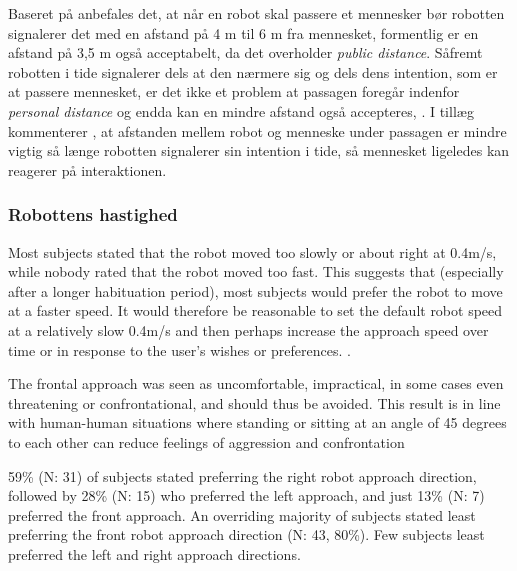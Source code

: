Baseret på \textcite[ss. 169-170]{PDF:HumanRobotEmodiedInteraction} anbefales det, at når en robot skal passere et mennesker bør robotten signalerer det med en afstand på 4 m til 6 m fra mennesket, formentlig er en afstand på 3,5 m også acceptabelt, da det overholder \textit{public distance}. Såfremt robotten i tide signalerer dels at den nærmere sig og dels dens intention, som er at passere mennesket, er det ikke et problem at passagen foregår indenfor \textit{personal distance} og endda kan en mindre afstand også accepteres, \parencite[s. 170]{PDF:HumanRobotEmodiedInteraction}. I tillæg kommenterer \textcite[s. 170]{PDF:HumanRobotEmodiedInteraction}, at afstanden mellem robot og menneske under passagen er mindre vigtig så længe robotten signalerer sin intention i tide, så mennesket ligeledes kan reagerer på interaktionen.    

\subsubsection*{Robottens hastighed}
\label{InteraktionSocialeRobotterParametreBevaegelsesmoenstreHastighed}
%









Most subjects stated that the robot moved too slowly or about right at 0.4m/s, while nobody rated that the robot moved too fast. This suggests that (especially after a longer habituation period), most subjects would prefer the robot to move at a faster speed. It would therefore be reasonable to set the default robot speed at a relatively slow 0.4m/s and then perhaps increase the approach speed over time or in response to the user’s wishes or preferences. \textcite[s. 178]{PDF:HowMayIServeYou}. 

The frontal approach was seen as uncomfortable, impractical, in some cases even threatening or confrontational, and should thus be avoided. This result is in line with human-human situations where standing or sitting at an angle of 45 degrees to each other can reduce feelings of aggression and confrontation \textcite[s. 178]{PDF:HowMayIServeYou}



59\% (N: 31) of subjects stated preferring the right robot approach direction, followed by 28\% (N: 15) who preferred the left approach, and just 13\% (N: 7) preferred the front approach. An overriding majority of subjects stated least preferring the front robot approach direction (N: 43, 80\%). Few subjects least preferred the left and right approach directions. 










